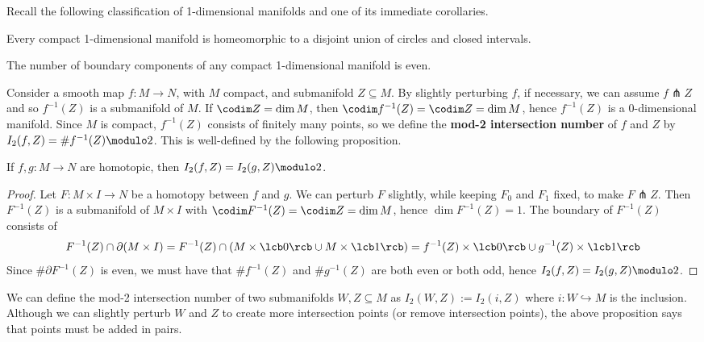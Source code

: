 Recall the following classification of 1-dimensional manifolds and one of its immediate corollaries.
\begin{prop}
Every compact 1-dimensional manifold is homeomorphic to a disjoint union of circles and closed intervals.
\end{prop}
\begin{cor}
The number of boundary components of any compact 1-dimensional manifold is even.
\end{cor}

Consider a smooth map $f : M \rightarrow N$, with $M$ compact, and submanifold $Z \subseteq M$. By slightly perturbing $f$, if necessary, we can assume $f \pitchfork Z$ and so $f^{-1}(Z)$ is a submanifold of $M$. If $\codim Z = \dim M$, then $\codim f^{-1}(Z) = \codim Z = \dim M$, hence $f^{-1}(Z)$ is a 0-dimensional manifold. Since $M$ is compact, $f^{-1}(Z)$ consists of finitely many points, so we define the \textbf{mod-2 intersection number} of $f$ and $Z$ by $I_2(f,Z) = \#f^{-1}(Z) \modulo 2$. This is well-defined by the following proposition.
\begin{prop}
If $f,g : M \rightarrow N$ are homotopic, then $I_2(f,Z) = I_2(g,Z) \modulo 2$.
\end{prop}
\begin{proof}
Let $F : M \times I \rightarrow N$ be a homotopy between $f$ and $g$. We can perturb $F$ slightly, while keeping $F_0$ and $F_1$ fixed, to make $F \pitchfork Z$. Then $F^{-1}(Z)$ is a submanifold of $M \times I$ with $\codim F^{-1}(Z) = \codim Z = \dim M$, hence $\dim F^{-1}(Z)=1$. The boundary of $F^{-1}(Z)$ consists of
\[ F^{-1}(Z) \cap \partial (M \times I) = F^{-1}(Z) \cap (M \times \lcb 0 \rcb \cup M \times \lcb 1 \rcb) = f^{-1}(Z) \times \lcb 0 \rcb \cup g^{-1}(Z) \times \lcb 1 \rcb \]
Since $\# \partial F^{-1}(Z)$ is even, we must have that $\# f^{-1}(Z)$ and $\# g^{-1}(Z)$ are both even or both odd, hence $I_2(f,Z) = I_2(g,Z) \modulo 2$.
\end{proof}
We can define the mod-2 intersection number of two submanifolds $W,Z \subseteq M$ as $I_2(W,Z) := I_2(i,Z)$ where $i : W \hookrightarrow M$ is the inclusion. Although we can slightly perturb $W$ and $Z$ to create more intersection points (or remove intersection points), the above proposition says that points must be added in pairs.



\unfinished







